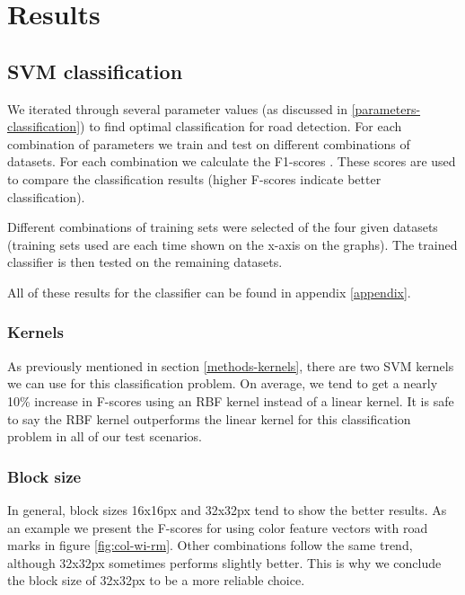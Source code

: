 \documentclass[runningheads,a4paper]{llncs}
\begin{document}
\section{Results}

\subsection{SVM classification}\label{results-svm-classification}
We iterated through several parameter values (as discussed in \ref{parameters-classification}) to find optimal classification for road detection. For each combination of parameters we train and test on different combinations of datasets. For each combination we calculate the F1-scores \cite{Powers2007}. These scores are used to compare the classification results (higher F-scores indicate better classification). 

Different combinations of training sets were selected of the four given datasets (training sets used are each time shown on the x-axis on the graphs). The trained classifier is then tested on the remaining datasets.

All of these results for the classifier can be found in appendix \ref{appendix}.

\subsubsection{Kernels}
As previously mentioned in section \ref{methods-kernels}, there are two SVM kernels we can use for this classification problem. On average, we tend to get a nearly 10\% increase in F-scores using an RBF kernel instead of a linear kernel. It is safe to say the RBF kernel outperforms the linear kernel for this classification problem in all of our test scenarios. 

\subsubsection{Block size}
In general, block sizes 16x16px and 32x32px tend to show the better results. As an example we present the F-scores for using color feature vectors with road marks in figure \ref{fig:col-wi-rm}. Other combinations follow the same trend, although 32x32px sometimes performs slightly better. This is why we conclude the block size of 32x32px to be a more reliable choice. 
\end{document}
